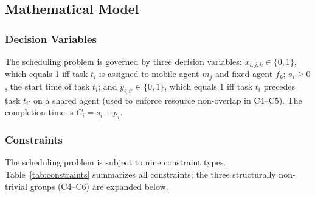 \documentclass[manuscript,screen,review]{acmart}
\begin{document}
\subsection{Mathematical Model}
\label{sec:math_model}

\subsubsection{Decision Variables}

The scheduling problem is governed by three decision variables:
$x_{i,j,k} \in \{0,1\}$, which equals 1 iff task $t_i$ is assigned to
mobile agent $m_j$ and fixed agent $f_k$; $s_i \geq 0$, the start time of
task $t_i$; and $y_{i,i'} \in \{0,1\}$, which equals 1 iff task $t_i$
precedes task $t_{i'}$ on a shared agent (used to enforce resource
non-overlap in C4--C5). The completion time is $C_i = s_i + p_i$.

\subsubsection{Constraints}

The scheduling problem is subject to nine constraint types.
Table~\ref{tab:constraints} summarizes all constraints; the three
structurally non-trivial groups (C4--C6) are expanded below.
\end{document}
